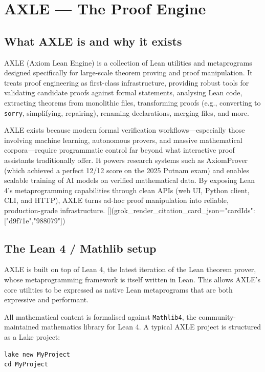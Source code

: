 \documentclass[19pt]{book}
\theoremstyle{plain}
\theoremstyle{definition}
\theoremstyle{remark}
\begin{document}
\chapter{AXLE — The Proof Engine}

\section{What AXLE is and why it exists}

AXLE (Axiom Lean Engine) is a collection of Lean utilities and metaprograms designed specifically for large-scale theorem proving and proof manipulation. It treats proof engineering as first-class infrastructure, providing robust tools for validating candidate proofs against formal statements, analysing Lean code, extracting theorems from monolithic files, transforming proofs (e.g., converting to \texttt{sorry}, simplifying, repairing), renaming declarations, merging files, and more.

AXLE exists because modern formal verification workflows—especially those involving machine learning, autonomous provers, and massive mathematical corpora—require programmatic control far beyond what interactive proof assistants traditionally offer. It powers research systems such as AxiomProver (which achieved a perfect 12/12 score on the 2025 Putnam exam) and enables scalable training of AI models on verified mathematical data. By exposing Lean 4’s metaprogramming capabilities through clean APIs (web UI, Python client, CLI, and HTTP), AXLE turns ad-hoc proof manipulation into reliable, production-grade infrastructure. [](grok_render_citation_card_json={"cardIds":["d9f71e","988079"]})

\section{The Lean 4 / Mathlib setup}

AXLE is built on top of Lean 4, the latest iteration of the Lean theorem prover, whose metaprogramming framework is itself written in Lean. This allows AXLE’s core utilities to be expressed as native Lean metaprograms that are both expressive and performant.

All mathematical content is formalised against \texttt{Mathlib4}, the community-maintained mathematics library for Lean 4. A typical AXLE project is structured as a Lake project:

\begin{verbatim}
lake new MyProject
cd MyProject
\end{verbatim}
\end{document}
